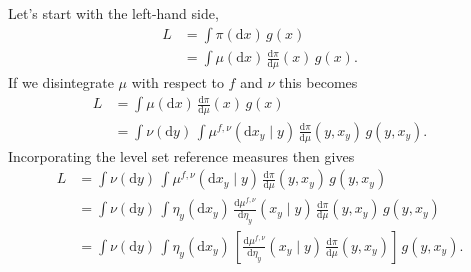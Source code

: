 \documentclass[
  letterpaper,
  DIV=11,
  numbers=noendperiod]{scrartcl}
\begin{document}
Let's start with the left-hand side, \begin{align*}
L
&=
\int \pi ( \mathrm{d} x ) \, g(x)
\\
&=
\int \mu ( \mathrm{d} x ) \, \frac{ \mathrm{d} \pi}{ \mathrm{d} \mu }(x) \, g(x).
\end{align*} If we disintegrate \(\mu\) with respect to \(f\) and
\(\nu\) this becomes \begin{align*}
L
&=
\int \mu ( \mathrm{d} x ) \, \frac{ \mathrm{d} \pi}{ \mathrm{d} \mu }(x) \, g(x)
\\
&=
\int \nu ( \mathrm{d} y ) \,
\int \mu^{f, \nu}( \mathrm{d} x_{y} \mid y) \,
\frac{ \mathrm{d} \pi}{ \mathrm{d} \mu }(y, x_{y}) \, g(y, x_{y}).
\end{align*} Incorporating the level set reference measures then gives
\begin{align*}
L
&=
\int \nu ( \mathrm{d} y ) \,
\int \mu^{f, \nu}( \mathrm{d} x_{y} \mid y) \,
\frac{ \mathrm{d} \pi}{ \mathrm{d} \mu }(y, x_{y}) \, g(y, x_{y})
\\
&=
\int \nu ( \mathrm{d} y ) \,
\int \eta_{y} ( \mathrm{d} x_{y}) \,
\frac{ \mathrm{d} \mu^{f, \nu}}{ \mathrm{d} \eta_{y} }(x_{y} \mid y) \,
\frac{ \mathrm{d} \pi}{ \mathrm{d} \mu }(y, x_{y}) \, g(y, x_{y})
\\
&=
\int \nu ( \mathrm{d} y ) \,
\int \eta_{y} ( \mathrm{d} x_{y}) \,
\left[ \frac{ \mathrm{d} \mu^{f, \nu}}{ \mathrm{d} \eta_{y} }(x_{y} \mid y) \,
\frac{ \mathrm{d} \pi}{ \mathrm{d} \mu }(y, x_{y}) \right] \, g(y, x_{y}).
\end{align*}
\end{document}
